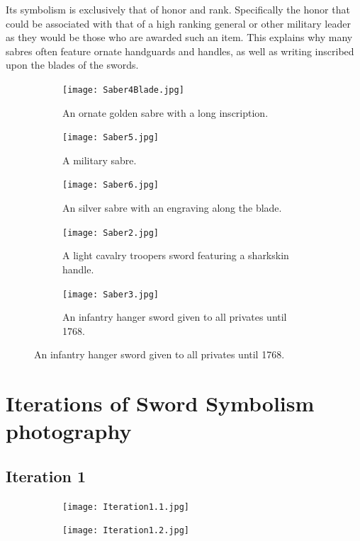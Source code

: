 \documentclass{article}
\begin{document}
Its symbolism is exclusively that of honor and rank. Specifically the honor that could be associated with that of a high ranking general or other military leader as they would be those who are awarded such an item. This explains why many sabres often feature ornate handguards and handles, as well as writing inscribed upon the blades of the swords.

\begin{figure}[H]
\centering
\caption{A collection of images from sabres at the National Army Museum.}
\label{fig:sabreImages}
\begin{subfigure}{0.3\textwidth}
    \texttt{[image: Saber4Blade.jpg]}
    \caption{An ornate golden sabre with a long inscription.}
    \label{fig:Saber4}
\end{subfigure}
\begin{subfigure}{0.3\textwidth}
    \texttt{[image: Saber5.jpg]}
    \caption{A military sabre.}
    \label{fig:Saber5}
\end{subfigure}
\begin{subfigure}{0.3\textwidth}
    \texttt{[image: Saber6.jpg]}
    \caption{An silver sabre with an engraving along the blade.}
    \label{fig:Saber6}
\end{subfigure}
\begin{subfigure}{0.3\textwidth}
    \texttt{[image: Saber2.jpg]}
    \caption{A light cavalry troopers sword featuring a sharkskin handle.}
    \label{fig:Saber2}
\end{subfigure}
\begin{subfigure}{0.3\textwidth}
    \texttt{[image: Saber3.jpg]}
    \caption{An infantry hanger sword given to all privates until 1768.}
    \label{fig:Saber3}
\end{subfigure}
\end{figure}

\pagebreak

\section{Iterations of Sword Symbolism photography}

\subsection{Iteration 1} \label{Iteration1}

\begin{figure}[h]
    \centering
    \caption{}
    \label{fig:Iteration1}
    \begin{subfigure}{0.49\textwidth}
        \texttt{[image: Iteration1.1.jpg]}
        \caption{}
        \label{fig:Iteration1.1}
    \end{subfigure}
    \begin{subfigure}{0.49\textwidth}
        \texttt{[image: Iteration1.2.jpg]}
        \caption{}
        \label{fig:Iteration1.2}
    \end{subfigure}
\end{figure}
\end{document}
